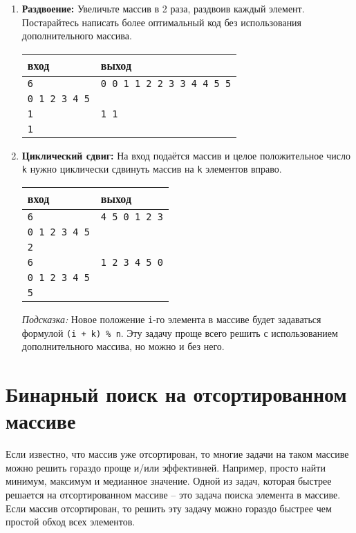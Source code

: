 \documentclass{article}
\begin{document}
\begin{enumerate}
\item \textbf{Раздвоение:} Увеличьте массив в 2 раза, раздвоив каждый элемент. Постарайтесь написать более оптимальный код без использования дополнительного массива.
\begin{center}
\begin{tabular}{ l | l }
 вход & выход \\ \hline
 \texttt{6} & \texttt{0 0 1 1 2 2 3 3 4 4 5 5}  \\  
 \texttt{0 1 2 3 4 5} & \\ \hline
 \texttt{1} & \texttt{1 1}  \\  
 \texttt{1} &  \\
\end{tabular}
\end{center}
\item \textbf{Циклический сдвиг:} На вход подаётся массив и целое положительное число \texttt{k} нужно циклически сдвинуть массив на \texttt{k} элементов вправо.
\begin{center}
\begin{tabular}{ l | l }
 вход & выход \\ \hline
 \texttt{6} & \texttt{4 5 0 1 2 3}  \\  
 \texttt{0 1 2 3 4 5} & \\
 \texttt{2} & \\ \hline
 \texttt{6} & \texttt{1 2 3 4 5 0}  \\  
 \texttt{0 1 2 3 4 5} & \\
 \texttt{5} & \\ 
\end{tabular}
\end{center}
\textit{Подсказка:} Новое положение \texttt{i}-го элемента в массиве будет задаваться формулой \texttt{(i + k) \% n}. Эту задачу проще всего решить с использованием дополнительного массива, но можно и без него.
\end{enumerate}



\section*{Бинарный поиск на отсортированном массиве}
Если известно, что массив уже отсортирован, то многие задачи на таком массиве можно решить гораздо проще и/или эффективней. Например, просто найти минимум, максимум и медианное значение. Одной из задач, которая быстрее решается на отсортированном массиве -- это задача поиска элемента в массиве. Если массив отсортирован, то решить эту задачу можно гораздо быстрее чем простой обход всех элементов. \\
\end{document}
